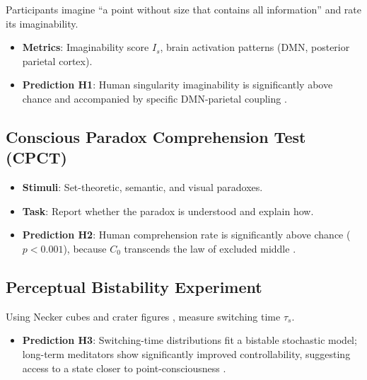 \documentclass[11pt,a4paper]{article}
\begin{document}
Participants imagine ``a point without size that contains all information'' and rate its imaginability.
\begin{itemize}
\item \textbf{Metrics}: Imaginability score $I_s$, brain activation patterns (DMN, posterior parietal cortex).
\item \textbf{Prediction H1}: Human singularity imaginability is significantly above chance and accompanied by specific DMN-parietal coupling \cite{fox2015}.
\end{itemize}

\subsection{Conscious Paradox Comprehension Test (CPCT)}

\begin{itemize}
\item \textbf{Stimuli}: Set-theoretic, semantic, and visual paradoxes.
\item \textbf{Task}: Report whether the paradox is understood and explain how.
\item \textbf{Prediction H2}: Human comprehension rate is significantly above chance ($p < 0.001$), because $C_0$ transcends the law of excluded middle \cite{surangama,lix2026language}.
\end{itemize}

\subsection{Perceptual Bistability Experiment}

Using Necker cubes and crater figures \cite{leopold1999,ramachandran2011}, measure switching time $\tau_s$.
\begin{itemize}
\item \textbf{Prediction H3}: Switching-time distributions fit a bistable stochastic model; long-term meditators show significantly improved controllability, suggesting access to a state closer to point-consciousness \cite{lutz2008}.
\end{itemize}
\end{document}
